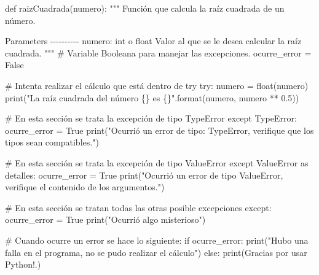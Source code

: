 \documentclass[
  letterpaper,
  DIV=11,
  numbers=noendperiod]{scrreprt}
\newenvironment{Shaded}{\begin{snugshade}}{\end{snugshade}}
\newcommand{\BuiltInTok}[1]{\textcolor[rgb]{0.00,0.23,0.31}{#1}}
\newcommand{\CommentTok}[1]{\textcolor[rgb]{0.37,0.37,0.37}{#1}}
\newcommand{\ControlFlowTok}[1]{\textcolor[rgb]{0.00,0.23,0.31}{#1}}
\newcommand{\FloatTok}[1]{\textcolor[rgb]{0.68,0.00,0.00}{#1}}
\newcommand{\ImportTok}[1]{\textcolor[rgb]{0.00,0.46,0.62}{#1}}
\newcommand{\KeywordTok}[1]{\textcolor[rgb]{0.00,0.23,0.31}{#1}}
\newcommand{\NormalTok}[1]{\textcolor[rgb]{0.00,0.23,0.31}{#1}}
\newcommand{\OperatorTok}[1]{\textcolor[rgb]{0.37,0.37,0.37}{#1}}
\newcommand{\PreprocessorTok}[1]{\textcolor[rgb]{0.68,0.00,0.00}{#1}}
\newcommand{\SpecialCharTok}[1]{\textcolor[rgb]{0.37,0.37,0.37}{#1}}
\newcommand{\StringTok}[1]{\textcolor[rgb]{0.13,0.47,0.30}{#1}}
\newcommand{\VariableTok}[1]{\textcolor[rgb]{0.07,0.07,0.07}{#1}}
\begin{document}
\begin{Shaded}
\begin{Highlighting}[]
\KeywordTok{def}\NormalTok{ raizCuadrada(numero):}
    \CommentTok{"""}
\CommentTok{    Función que calcula la raíz cuadrada de un número.}

\CommentTok{    Parameters}
\CommentTok{    {-}{-}{-}{-}{-}{-}{-}{-}{-}{-}}
\CommentTok{    numero: int o float}
\CommentTok{    Valor al que se le desea calcular la raíz cuadrada.}
\CommentTok{    }
\CommentTok{    """}
    \CommentTok{\# Variable Booleana para manejar las excepciones.}
\NormalTok{    ocurre\_error }\OperatorTok{=} \VariableTok{False}
    
    \CommentTok{\# Intenta realizar el cálculo que está dentro de try}
    \ControlFlowTok{try}\NormalTok{:}
\NormalTok{        numero }\OperatorTok{=} \BuiltInTok{float}\NormalTok{(numero)}
        \BuiltInTok{print}\NormalTok{(}\StringTok{"La raíz cuadrada del número }\SpecialCharTok{\{\}}\StringTok{ es }\SpecialCharTok{\{\}}\StringTok{"}\NormalTok{.}\BuiltInTok{format}\NormalTok{(numero, numero }\OperatorTok{**} \FloatTok{0.5}\NormalTok{))}

    \CommentTok{\# En esta sección se trata la excepción de tipo TypeError}
    \ControlFlowTok{except} \PreprocessorTok{TypeError}\NormalTok{:}
\NormalTok{        ocurre\_error }\OperatorTok{=} \VariableTok{True}
        \BuiltInTok{print}\NormalTok{(}\StringTok{"Ocurrió un error de tipo: TypeError, verifique que los tipos sean compatibles."}\NormalTok{)}

    \CommentTok{\# En esta sección se trata la excepción de tipo ValueError}
    \ControlFlowTok{except} \PreprocessorTok{ValueError} \ImportTok{as}\NormalTok{ detalles:}
\NormalTok{        ocurre\_error }\OperatorTok{=} \VariableTok{True}
        \BuiltInTok{print}\NormalTok{(}\StringTok{"Ocurrió un error de tipo ValueError, verifique el contenido de los argumentos."}\NormalTok{)}

    \CommentTok{\# En esta sección se tratan todas las otras posible excepciones}
    \ControlFlowTok{except}\NormalTok{:}
\NormalTok{        ocurre\_error }\OperatorTok{=} \VariableTok{True}
        \BuiltInTok{print}\NormalTok{(}\StringTok{"Ocurrió algo misterioso"}\NormalTok{)}
        
    \CommentTok{\# Cuando ocurre un error se hace lo siguiente:}
    \ControlFlowTok{if}\NormalTok{ ocurre\_error:}
        \BuiltInTok{print}\NormalTok{(}\StringTok{"Hubo una falla en el programa, no se pudo realizar el cálculo"}\NormalTok{)}
    \ControlFlowTok{else}\NormalTok{:}
        \BuiltInTok{print}\NormalTok{(}\StringTok{\textquotesingle{}Gracias por usar Python!.\textquotesingle{}}\NormalTok{)}
\end{Highlighting}
\end{Shaded}
\end{document}
